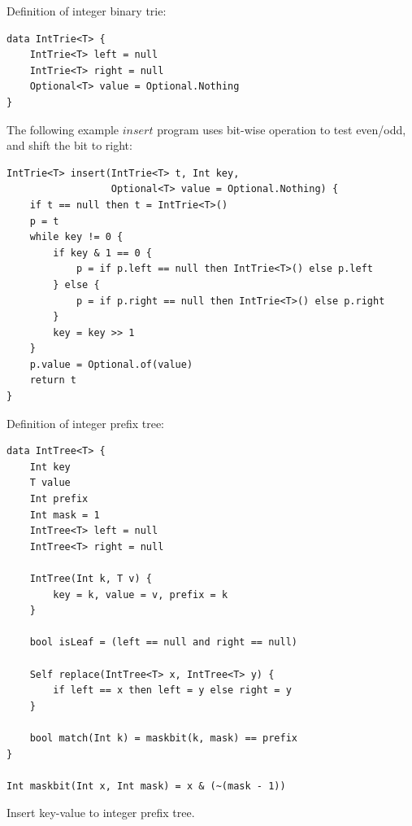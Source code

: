 \documentclass[b5paper]{article}
\begin{document}
Definition of integer binary trie:

\begin{lstlisting}[language = Bourbaki]
data IntTrie<T> {
    IntTrie<T> left = null
    IntTrie<T> right = null
    Optional<T> value = Optional.Nothing
}
\end{lstlisting}

The following example $insert$ program uses bit-wise operation to test even/odd, and shift the bit to right:

\begin{lstlisting}[language = Bourbaki]
IntTrie<T> insert(IntTrie<T> t, Int key,
                  Optional<T> value = Optional.Nothing) {
    if t == null then t = IntTrie<T>()
    p = t
    while key != 0 {
        if key & 1 == 0 {
            p = if p.left == null then IntTrie<T>() else p.left
        } else {
            p = if p.right == null then IntTrie<T>() else p.right
        }
        key = key >> 1
    }
    p.value = Optional.of(value)
    return t
}
\end{lstlisting}



Definition of integer prefix tree:

\begin{lstlisting}[language = Bourbaki]
data IntTree<T> {
    Int key
    T value
    Int prefix
    Int mask = 1
    IntTree<T> left = null
    IntTree<T> right = null

    IntTree(Int k, T v) {
        key = k, value = v, prefix = k
    }

    bool isLeaf = (left == null and right == null)

    Self replace(IntTree<T> x, IntTree<T> y) {
        if left == x then left = y else right = y
    }

    bool match(Int k) = maskbit(k, mask) == prefix
}

Int maskbit(Int x, Int mask) = x & (~(mask - 1))
\end{lstlisting}

Insert key-value to integer prefix tree.
\end{document}
